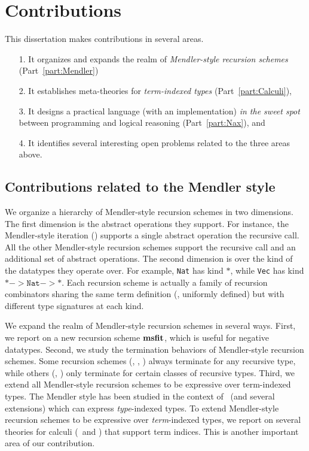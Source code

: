 \section{Contributions}\label{sec:intro:contrib}
This dissertation makes contributions in several areas.
\begin{itemize}
\item[1.]
    It organizes and expands the realm of \emph{Mendler-style recursion schemes}
    (Part~\ref{part:Mendler})

\item[2.] It establishes meta-theories for \emph{term-indexed types}
        (Part~\ref{part:Calculi}),

\item[3.] It designs a practical language (with an implementation)
        \emph{in the sweet spot} between programming and logical reasoning
        (Part~\ref{part:Nax}), and

\item[4.] It identifies several interesting open problems related to the three areas above.
\end{itemize}

\subsection{Contributions related to the Mendler style}
We organize a hierarchy of Mendler-style recursion schemes in two dimensions.
The first dimension is the abstract operations they support. For instance,
the Mendler-style iteration (\MIt) supports a single abstract operation
the recursive call. All the other Mendler-style recursion schemes
support the recursive call and an additional set of abstract operations. 
The second dimension is over the kind of the datatypes they operate over.
For example, \texttt{Nat} has kind $*$, while \texttt{Vec}
has kind $* -> \mathtt{Nat} -> *$. Each recursion scheme is actually a
family of recursion combinators sharing the same term definition
(\ie, uniformly defined) but with different type signatures at each kind.

We expand the realm of Mendler-style recursion schemes in several ways.
First, we report on a new recursion scheme $\mathbf{msfit}$, which is useful
for negative datatypes.  Second, we study the termination behaviors
of Mendler-style recursion schemes. Some recursion schemes (\eg, \MIt, \MsfIt)
always terminate for any recursive type, while others (\eg, \McvPr) only
terminate for certain classes of recursive types. Third, we extend
all Mendler-style recursion schemes to be expressive over term-indexed types.
The Mendler style has been studied in the context of \Fw\ (and several
extensions) which can express \emph{type}-indexed types. To extend Mendler-style
recursion schemes to be expressive over \emph{term}-indexed types, we report on
several theories for calculi (\Fi\ and \Fixi) that support term indices.
This is another important area of our contribution.

